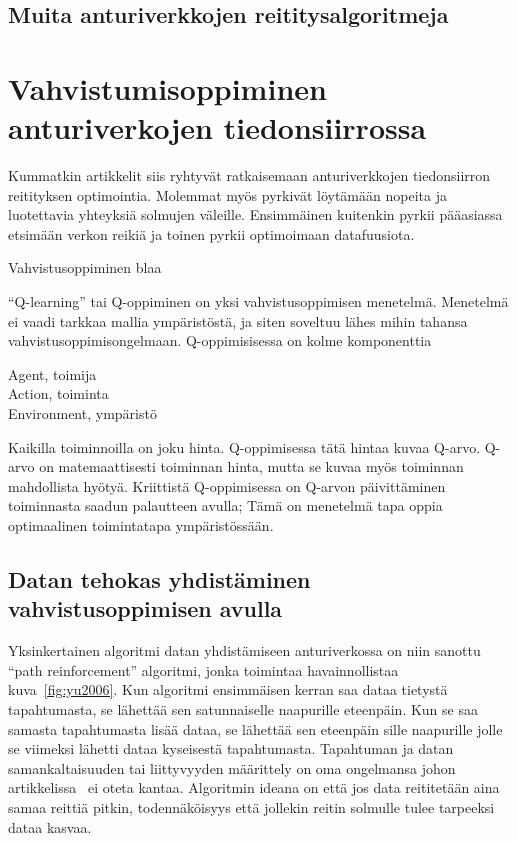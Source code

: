 
\subsection{Muita anturiverkkojen reititysalgoritmeja}

\section{Vahvistumisoppiminen anturiverkojen tiedonsiirrossa}

Kummatkin artikkelit siis ryhtyvät ratkaisemaan anturiverkkojen tiedonsiirron
reitityksen optimointia. Molemmat myös pyrkivät löytämään nopeita ja
luotettavia yhteyksiä solmujen väleille. Ensimmäinen kuitenkin pyrkii
pääasiassa etsimään verkon reikiä ja toinen pyrkii optimoimaan datafuusiota.


Vahvistusoppiminen blaa

``Q-learning'' tai Q-oppiminen on yksi vahvistusoppimisen menetelmä. Menetelmä
ei vaadi tarkkaa mallia ympäristöstä, ja siten soveltuu lähes mihin tahansa
vahvistusoppimisongelmaan. Q-oppimisisessa on kolme komponenttia
\begin{description}
  \item[Agent, toimija] 
  \item[Action, toiminta] 
  \item[Environment, ympäristö] 
\end{description}

Kaikilla toiminnoilla on joku hinta. Q-oppimisessa tätä hintaa kuvaa Q-arvo.
Q-arvo on matemaattisesti toiminnan hinta, mutta se kuvaa myös toiminnan
mahdollista hyötyä. Kriittistä Q-oppimisessa on Q-arvon päivittäminen
toiminnasta saadun palautteen avulla; Tämä on menetelmä tapa oppia optimaalinen
toimintatapa ympäristössään.

\subsection{Datan tehokas yhdistäminen vahvistusoppimisen avulla}

Yksinkertainen algoritmi datan yhdistämiseen anturiverkossa on niin sanottu
``path reinforcement'' algoritmi, jonka toimintaa havainnollistaa
kuva~\ref{fig:yu2006}. Kun algoritmi ensimmäisen kerran saa dataa tietystä
tapahtumasta, se lähettää sen satunnaiselle naapurille eteenpäin. Kun se saa
samasta tapahtumasta lisää dataa, se lähettää sen eteenpäin sille naapurille
jolle se viimeksi lähetti dataa kyseisestä tapahtumasta.  Tapahtuman ja datan
samankaltaisuuden tai liittyvyyden määrittely on oma ongelmansa johon
artikkelissa~\cite{Yu2006} ei oteta kantaa. Algoritmin ideana on että jos data
reititetään aina samaa reittiä pitkin, todennäköisyys että jollekin reitin
solmulle tulee tarpeeksi dataa kasvaa.

